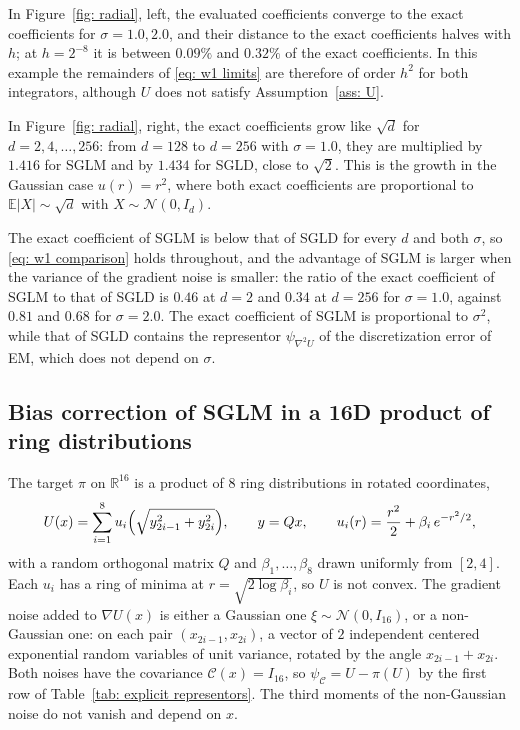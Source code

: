 In Figure~\ref{fig: radial}, left, the evaluated coefficients converge to the exact coefficients for $\sigma = 1.0, 2.0$, and their distance to the exact coefficients halves with $h$; at $h = 2^{-8}$ it is between $0.09\%$ and $0.32\%$ of the exact coefficients. In this example the remainders of \eqref{eq: w1 limits} are therefore of order $h^2$ for both integrators, although $U$ does not satisfy Assumption~\ref{ass: U}.

In Figure~\ref{fig: radial}, right, the exact coefficients grow like $\sqrt d$ for $d = 2, 4, \dots, 256$: from $d = 128$ to $d = 256$ with $\sigma = 1.0$, they are multiplied by $1.416$ for SGLM and by $1.434$ for SGLD, close to $\sqrt 2$. This is the growth in the Gaussian case $u(r) = r^2$, where both exact coefficients are proportional to $\mathbb E|X| \sim \sqrt d$ with $X \sim \mathcal N(0, I_d)$.

The exact coefficient of SGLM is below that of SGLD for every $d$ and both $\sigma$, so \eqref{eq: w1 comparison} holds throughout, and the advantage of SGLM is larger when the variance of the gradient noise is smaller: the ratio of the exact coefficient of SGLM to that of SGLD is $0.46$ at $d = 2$ and $0.34$ at $d = 256$ for $\sigma = 1.0$, against $0.81$ and $0.68$ for $\sigma = 2.0$. The exact coefficient of SGLM is proportional to $\sigma^2$, while that of SGLD contains the representor $\psi_{\nabla^2 U}$ of the discretization error of EM, which does not depend on $\sigma$.

\subsection{Bias correction of SGLM in a 16D product of ring distributions}
\label{subsec: rings}

The target $\pi$ on $\mathbb R^{16}$ is a product of $8$ ring distributions in rotated coordinates,
\begin{equation}
    U(x) = \sum_{i=1}^{8} u_i\Bigl( \sqrt{y_{2i-1}^2 + y_{2i}^2} \Bigr) , \qquad y = Q x , \qquad u_i(r) = \frac{r^2}{2} + \beta_i\, e^{-r^2/2} ,
    \label{eq: ring potential}
\end{equation}
with a random orthogonal matrix $Q$ and $\beta_1, \dots, \beta_8$ drawn uniformly from $[2, 4]$. Each $u_i$ has a ring of minima at $r = \sqrt{2 \log \beta_i}$, so $U$ is not convex. The gradient noise added to $\nabla U(x)$ is either a Gaussian one $\xi \sim \mathcal N(0, I_{16})$, or a non-Gaussian one: on each pair $(x_{2i-1}, x_{2i})$, a vector of $2$ independent centered exponential random variables of unit variance, rotated by the angle $x_{2i-1} + x_{2i}$. Both noises have the covariance $\mathcal C(x) = I_{16}$, so $\psi_{\mathcal C} = U - \pi(U)$ by the first row of Table~\ref{tab: explicit representors}. The third moments of the non-Gaussian noise do not vanish and depend on $x$.

